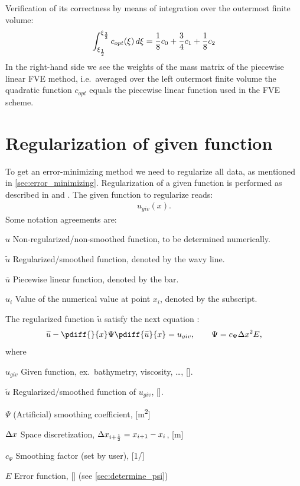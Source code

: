 Verification of its correctness by means of integration over the outermost finite volume:
\begin{align}
\int_{\xi_{\frac{1}{2}}}^{\xi_{\frac{3}{2}}} c_{opt}(\xi)\, d\xi = \frac{1}{8} c_0 + \frac{3}{4} c_1 + \frac{1}{8} c_2
\end{align}
In the right-hand side we see the weights of the mass matrix of the piecewise linear FVE
method, i.e.\ averaged over the left outermost finite volume the quadratic function $c_{opt}$
equals the piecewise linear function used in the FVE scheme.
\section{Regularization of given function}
To get an error-minimizing method we need to regularize all data, as mentioned in \autoref{sec:error_minimizing}.
Regularization of a given function is performed as described in \citet{Borsboom1998} and \citet{Borsboom2003}.
The given function to regularize reads:
\begin{align}
    u_{giv}(x).
\end{align}
Some notation agreements are:
\begin{symbollist}
    \item[$u$] Non-regularized/non-smoothed function, to be determined numerically.
    \item[$\widetilde u$] Regularized/smoothed function, denoted by the wavy line.
    \item[$\overline u$] Piecewise linear function, denoted by the bar.
    \item[$u_i$] Value of the numerical value at point $x_i$, denoted by the subscript.
\end{symbollist}

The regularized function $\widetilde u$ satisfy the next equation \citep[eq.\ 6]{Borsboom1998}:
\begin{align}
    \widetilde u - \pdiff{}{x} \Psi \pdiff{\widetilde u}{x} = u_{giv}, \qquad \Psi = c_{\Psi}\Delta x^2 E, \label{eq:regularization}
\end{align}
where
\begin{symbollist}
    \item[$u_{giv}$] Given function, ex.\ bathymetry, viscosity, \ldots, [\si{\cdot}].
    \item[$\widetilde u$] Regularized/smoothed function of $u_{giv}$, [\si{\cdot}].
    \item[$\Psi$] (Artificial) smoothing coefficient, [\si{\square\metre}]
    \item[$\Delta x$] Space discretization, $\Delta x_{i+\frac{1}{2}} = x_{i+1} - x_{i}$, [\si{\metre}]
    \item[$c_{\Psi}$] Smoothing factor (set by user), [\si{1/\cdot}]
    \item[$E$] Error function, [\si{\cdot}] (see \autoref{sec:determine_psi})
\end{symbollist}


